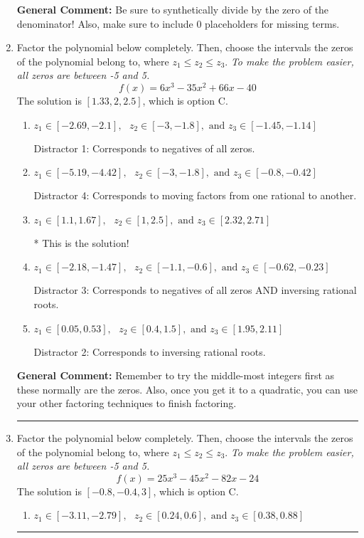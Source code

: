 \documentclass{extbook}[14pt]
\newcommand{\litem}[1]{\item #1

\rule{\textwidth}{0.4pt}}
\begin{document}
\begin{enumerate}
{\textbf{General Comment:} Be sure to synthetically divide by the zero of the denominator! Also, make sure to include 0 placeholders for missing terms.
}
\litem{
Factor the polynomial below completely. Then, choose the intervals the zeros of the polynomial belong to, where $z_1 \leq z_2 \leq z_3$. \textit{To make the problem easier, all zeros are between -5 and 5.}
\[ f(x) = 6x^{3} -35 x^{2} +66 x -40 \]The solution is \( [1.33, 2, 2.5] \), which is option C.\begin{enumerate}[label=\Alph*.]
\item \( z_1 \in [-2.69, -2.1], \text{   }  z_2 \in [-3, -1.8], \text{   and   } z_3 \in [-1.45, -1.14] \)

 Distractor 1: Corresponds to negatives of all zeros.
\item \( z_1 \in [-5.19, -4.42], \text{   }  z_2 \in [-3, -1.8], \text{   and   } z_3 \in [-0.8, -0.42] \)

 Distractor 4: Corresponds to moving factors from one rational to another.
\item \( z_1 \in [1.1, 1.67], \text{   }  z_2 \in [1, 2.5], \text{   and   } z_3 \in [2.32, 2.71] \)

* This is the solution!
\item \( z_1 \in [-2.18, -1.47], \text{   }  z_2 \in [-1.1, -0.6], \text{   and   } z_3 \in [-0.62, -0.23] \)

 Distractor 3: Corresponds to negatives of all zeros AND inversing rational roots.
\item \( z_1 \in [0.05, 0.53], \text{   }  z_2 \in [0.4, 1.5], \text{   and   } z_3 \in [1.95, 2.11] \)

 Distractor 2: Corresponds to inversing rational roots.
\end{enumerate}

\textbf{General Comment:} Remember to try the middle-most integers first as these normally are the zeros. Also, once you get it to a quadratic, you can use your other factoring techniques to finish factoring.
}
\litem{
Factor the polynomial below completely. Then, choose the intervals the zeros of the polynomial belong to, where $z_1 \leq z_2 \leq z_3$. \textit{To make the problem easier, all zeros are between -5 and 5.}
\[ f(x) = 25x^{3} -45 x^{2} -82 x -24 \]The solution is \( [-0.8, -0.4, 3] \), which is option C.\begin{enumerate}[label=\Alph*.]
\item \( z_1 \in [-3.11, -2.79], \text{   }  z_2 \in [0.24, 0.6], \text{   and   } z_3 \in [0.38, 0.88] \)


\end{enumerate}}
\end{enumerate}
\end{document}
